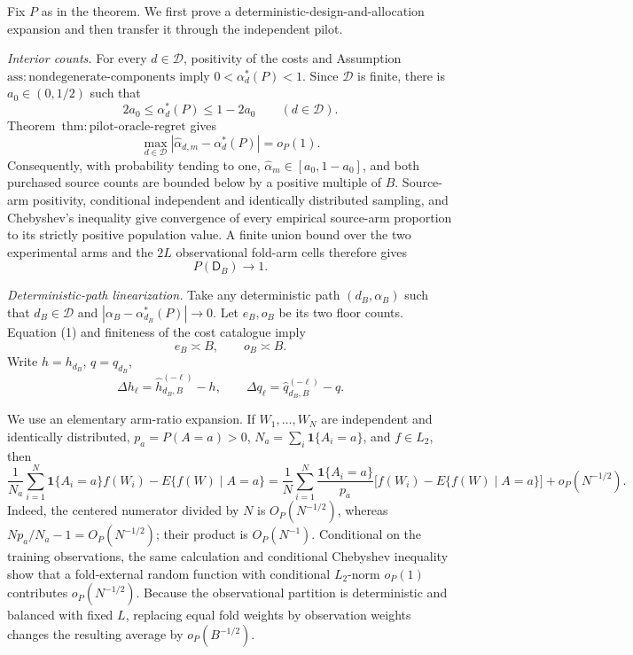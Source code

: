 Fix \(P\) as in the theorem.  We first prove a deterministic-design-and-allocation expansion and then transfer it through the independent pilot.

\emph{Interior counts.}
For every \(d\in\mathcal D\), positivity of the costs and Assumption~\(\mathrm{ass{:}nondegenerate\text{-}components}\) imply \(0<\alpha_d^*(P)<1\).  Since \(\mathcal D\) is finite, there is \(a_0\in(0,1/2)\) such that
\[
 2a_0\le \alpha_d^*(P)\le 1-2a_0
 \qquad(d\in\mathcal D).                                      \tag{1}
\]
Theorem~\(\mathrm{thm{:}pilot\text{-}oracle\text{-}regret}\) gives
\[
 \max_{d\in\mathcal D}
 |\widehat\alpha_{d,m}-\alpha_d^*(P)|=o_P(1).                  \tag{2}
\]
Consequently, with probability tending to one, \(\widehat\alpha_m\in[a_0,1-a_0]\), and both purchased source counts are bounded below by a positive multiple of \(B\).  Source-arm positivity, conditional independent and identically distributed sampling, and Chebyshev's inequality give convergence of every empirical source-arm proportion to its strictly positive population value.  A finite union bound over the two experimental arms and the \(2L\) observational fold-arm cells therefore gives
\[
 P(\mathsf D_B)\longrightarrow1.                               \tag{3}
\]

\emph{Deterministic-path linearization.}
Take any deterministic path \((d_B,\alpha_B)\) such that \(d_B\in\mathcal D\) and \(|\alpha_B-\alpha_{d_B}^*(P)|\to0\).  Let \(e_B,o_B\) be its two floor counts.  Equation (1) and finiteness of the cost catalogue imply
\[
 e_B\asymp B,\qquad o_B\asymp B.                              \tag{4}
\]
Write \(h=h_{d_B}\), \(q=q_{d_B}\),
\[
 \Delta h_\ell=\widehat h_{d_B,B}^{(-\ell)}-h,
 \qquad
 \Delta q_\ell=\widehat q_{d_B,B}^{(-\ell)}-q.
\]

We use an elementary arm-ratio expansion.  If \(W_1,\ldots,W_N\) are independent and identically distributed, \(p_a=P(A=a)>0\), \(N_a=\sum_i\mathbf1\{A_i=a\}\), and \(f\in L_2\), then
\[
 \frac1{N_a}\sum_{i=1}^N\mathbf1\{A_i=a\}f(W_i)
 -E\{f(W)\mid A=a\}
 =\frac1N\sum_{i=1}^N\frac{\mathbf1\{A_i=a\}}{p_a}
 \bigl[f(W_i)-E\{f(W)\mid A=a\}\bigr]
 +o_P(N^{-1/2}).                                                \tag{5}
\]
Indeed, the centered numerator divided by \(N\) is \(O_P(N^{-1/2})\), whereas \(Np_a/N_a-1=O_P(N^{-1/2})\); their product is \(O_P(N^{-1})\).  Conditional on the training observations, the same calculation and conditional Chebyshev inequality show that a fold-external random function with conditional \(L_2\)-norm \(o_P(1)\) contributes \(o_P(N^{-1/2})\).  Because the observational partition is deterministic and balanced with fixed \(L\), replacing equal fold weights by observation weights changes the resulting average by \(o_P(B^{-1/2})\).

